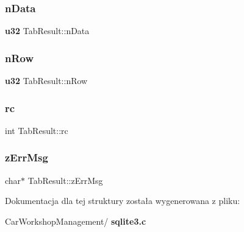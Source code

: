 \mbox{\label{struct_tab_result_a15ec3f09bc4ccc6945c2e76bf32cf457}} 
\subsubsection{nData}
{\footnotesize\ttfamily \textbf{ u32} Tab\+Result\+::n\+Data}

\mbox{\label{struct_tab_result_a0c2a87855e7665334ec4f39cc4e2fe8b}} 
\subsubsection{nRow}
{\footnotesize\ttfamily \textbf{ u32} Tab\+Result\+::n\+Row}

\mbox{\label{struct_tab_result_a44bb015ce660ed3f987e324919d73f4d}} 
\subsubsection{rc}
{\footnotesize\ttfamily int Tab\+Result\+::rc}

\mbox{\label{struct_tab_result_a6e7104bb622be05f16b6470dbb68a6c7}} 
\subsubsection{zErrMsg}
{\footnotesize\ttfamily char$\ast$ Tab\+Result\+::z\+Err\+Msg}



Dokumentacja dla tej struktury została wygenerowana z pliku\+:\begin{DoxyCompactItemize}
\item 
Car\+Workshop\+Management/\textbf{ sqlite3.\+c}\end{DoxyCompactItemize}
